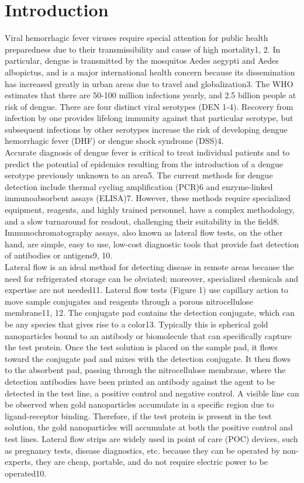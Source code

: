 \documentclass{article}
\begin{document}
\section{Introduction}
Viral hemorrhagic fever viruses require special attention for public health preparedness due to their transmissibility and cause of high mortality1, 2.  In particular, dengue is transmitted by the mosquitos Aedes aegypti and Aedes albopictus, and is a major international health concern because its dissemination has increased greatly in urban areas due to travel and globalization3. The WHO estimates that there are 50-100 million infections yearly, and 2.5 billion people at risk of dengue. There are four distinct viral serotypes (DEN 1-4). Recovery from infection by one provides lifelong immunity against that particular serotype, but subsequent infections by other serotypes increase the risk of developing dengue hemorrhagic fever (DHF) or dengue shock syndrome (DSS)4. \\
Accurate diagnosis of dengue fever is critical to treat individual patients and to predict the potential of epidemics resulting from the introduction of a dengue serotype previously unknown to an area5. The current methods for dengue detection include thermal cycling amplification (PCR)6 and enzyme-linked immunoabsorbent assays (ELISA)7. However, these methods require specialized equipment, reagents, and highly trained personnel, have a complex methodology, and a slow turnaround for readout, challenging their suitability in the field8. Immunochromatography assays, also known as lateral flow tests, on the other hand, are simple, easy to use, low-cost diagnostic tools that provide fast detection of antibodies or antigens9, 10. \\
Lateral flow is an ideal method for detecting disease in remote areas because the need for refrigerated storage can be obviated; moreover, specialized chemicals and expertise are not needed11. Lateral flow tests (Figure 1) use capillary action to move sample conjugates and reagents through a porous nitrocellulose membrane11, 12. The conjugate pad contains the detection conjugate, which can be any species that gives rise to a color13. Typically this is spherical gold nanoparticles bound to an antibody or biomolecule that can specifically capture the test protein. Once the test solution is placed on the sample pad, it flows toward the conjugate pad and mixes with the detection conjugate. It then flows to the absorbent pad, passing through the nitrocellulose membrane, where the detection antibodies have been printed an antibody against the agent to be detected in the test line, a positive control and negative control. A visible line can be observed when gold nanoparticles accumulate in a specific region due to ligand-receptor binding. Therefore, if the test protein is present in the test solution, the gold nanoparticles will accumulate at both the positive control and test lines. Lateral flow strips are widely used in point of care (POC) devices, such as pregnancy tests, disease diagnostics, etc. because they can be operated by non-experts, they are cheap, portable, and do not require electric power to be operated10. \\
\end{document}
